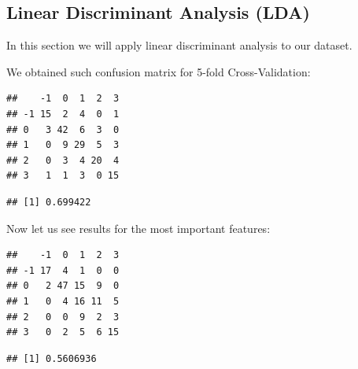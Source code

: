 \documentclass[11pt,a4paper]{article}\usepackage[]{graphicx}\usepackage[]{xcolor}
\makeatletter
\newenvironment{kframe}{%
 \def\at@end@of@kframe{}%
 \ifinner\ifhmode%
  \def\at@end@of@kframe{\end{minipage}}%
  \begin{minipage}{\columnwidth}%
 \fi\fi%
 \def\FrameCommand##1{\hskip\@totalleftmargin \hskip-\fboxsep
 \colorbox{shadecolor}{##1}\hskip-\fboxsep
     \hskip-\linewidth \hskip-\@totalleftmargin \hskip\columnwidth}%
 \MakeFramed {\advance\hsize-\width
   \@totalleftmargin\z@ \linewidth\hsize
   \@setminipage}}%
 {\par\unskip\endMakeFramed%
 \at@end@of@kframe}
\newenvironment{knitrout}{}{} %
\makeatother
\begin{document}
	\subsection{Linear Discriminant Analysis (LDA)}

In this section we will apply linear discriminant analysis to our dataset.



We obtained such confusion matrix for 5-fold Cross-Validation: 

\begin{knitrout}
\color{fgcolor}\begin{kframe}
\begin{verbatim}
##    -1  0  1  2  3
## -1 15  2  4  0  1
## 0   3 42  6  3  0
## 1   0  9 29  5  3
## 2   0  3  4 20  4
## 3   1  1  3  0 15
\end{verbatim}
\end{kframe}
\end{knitrout}

\begin{knitrout}
\color{fgcolor}\begin{kframe}
\begin{verbatim}
## [1] 0.699422
\end{verbatim}
\end{kframe}
\end{knitrout}

	Now let us see results for the most important features:
	
\begin{knitrout}
\color{fgcolor}\begin{kframe}
\begin{verbatim}
##    -1  0  1  2  3
## -1 17  4  1  0  0
## 0   2 47 15  9  0
## 1   0  4 16 11  5
## 2   0  0  9  2  3
## 3   0  2  5  6 15
\end{verbatim}
\end{kframe}
\end{knitrout}

\begin{knitrout}
\color{fgcolor}\begin{kframe}
\begin{verbatim}
## [1] 0.5606936
\end{verbatim}
\end{kframe}
\end{knitrout}
\end{document}
